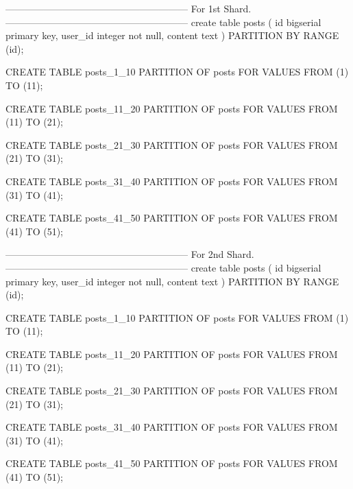 ---------------------------------------------------------
For 1st Shard.
---------------------------------------------------------
create table posts (
	id bigserial primary key,
	user_id integer not null,
	content text
) PARTITION BY RANGE (id);

CREATE TABLE posts_1_10 PARTITION OF posts
FOR VALUES FROM (1) TO (11);

CREATE TABLE posts_11_20 PARTITION OF posts
FOR VALUES FROM (11) TO (21);

CREATE TABLE posts_21_30 PARTITION OF posts
FOR VALUES FROM (21) TO (31);

CREATE TABLE posts_31_40 PARTITION OF posts
FOR VALUES FROM (31) TO (41);

CREATE TABLE posts_41_50 PARTITION OF posts
FOR VALUES FROM (41) TO (51);

---------------------------------------------------------
For 2nd Shard.
---------------------------------------------------------
create table posts (
	id bigserial primary key,
	user_id integer not null,
	content text
) PARTITION BY RANGE (id);

CREATE TABLE posts_1_10 PARTITION OF posts
FOR VALUES FROM (1) TO (11);

CREATE TABLE posts_11_20 PARTITION OF posts
FOR VALUES FROM (11) TO (21);

CREATE TABLE posts_21_30 PARTITION OF posts
FOR VALUES FROM (21) TO (31);

CREATE TABLE posts_31_40 PARTITION OF posts
FOR VALUES FROM (31) TO (41);

CREATE TABLE posts_41_50 PARTITION OF posts
FOR VALUES FROM (41) TO (51);


